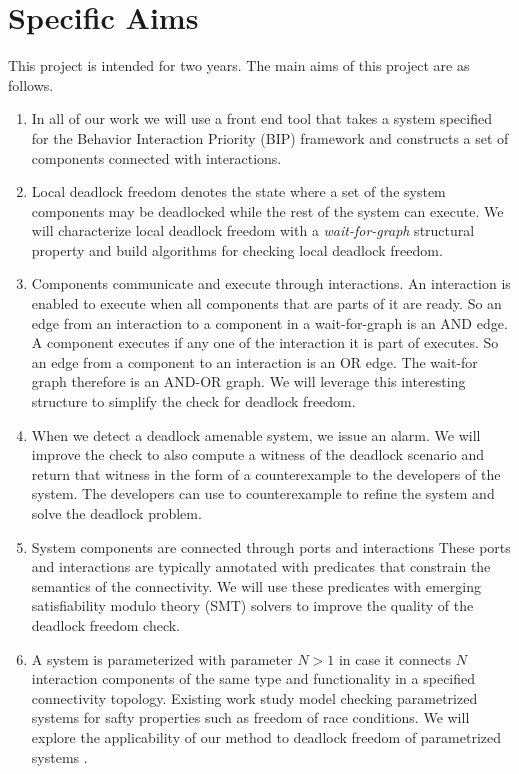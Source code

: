 \section{Specific Aims}

This project is intended for two years.
The main aims of this project are as follows.

\begin{enumerate}
\item 
In all of our work we will use a front end tool that
takes a system specified for the Behavior Interaction Priority (BIP)
framework and constructs a set of components connected 
with interactions. 

\item 
Local deadlock freedom denotes the state where a set of the 
system components may be deadlocked while the rest of the 
system can execute. 
We will characterize local deadlock freedom with a 
{\em wait-for-graph} structural
property and build algorithms for checking local deadlock
freedom. 

\item 
Components communicate and execute through interactions. 
An interaction is enabled to execute when all components that 
are parts of it are ready. 
So an edge from an interaction to a component in a wait-for-graph
is an AND edge. 
A component executes if any one of the interaction it is part of
executes. So an edge from a component to an interaction is an OR
edge. 
The wait-for graph therefore is an AND-OR graph. 
We will leverage this interesting structure to simplify the
check for deadlock freedom. 

\item 
When we detect a deadlock amenable system, we issue an alarm. 
We will improve the check to also compute a witness of the deadlock scenario 
and return that witness in the form of a counterexample 
to the developers of the system. 
The developers can use to counterexample to refine the system and solve
the deadlock problem. 

\item 
System components are connected through ports and interactions
These ports and interactions are typically annotated with predicates
that constrain the semantics of the connectivity. 
We will use these predicates with emerging satisfiability modulo theory (SMT) 
solvers to improve the quality of the deadlock freedom check.

		
\item 
A system is parameterized with parameter $N>1$ 
in case it connects $N$ interaction components of the 
same type and functionality in a specified connectivity topology. 
Existing work study model checking parametrized systems for safty properties
such as freedom of race conditions. 
We will explore the applicability of our method to deadlock freedom 
of parametrized systems
		. 


\end{enumerate}
